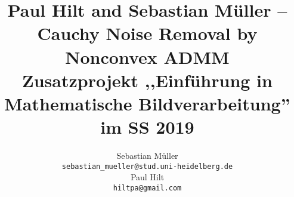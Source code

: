 \documentclass[10pt,a4paper]{article}
\begin{document}
\title{Paul Hilt and Sebastian M\"uller -- Cauchy Noise Removal by Nonconvex ADMM\\[0.5cm] \large{Zusatzprojekt ,,Einf\"uhrung in Mathematische Bildverarbeitung'' im SS 2019}}

\author{Sebastian M\"uller\\
{\tt\small sebastian\_mueller@stud.uni-heidelberg.de}\\
Paul Hilt\\
{\tt\small hiltpa@gmail.com}
}

\maketitle



{\small


}
\end{document}
